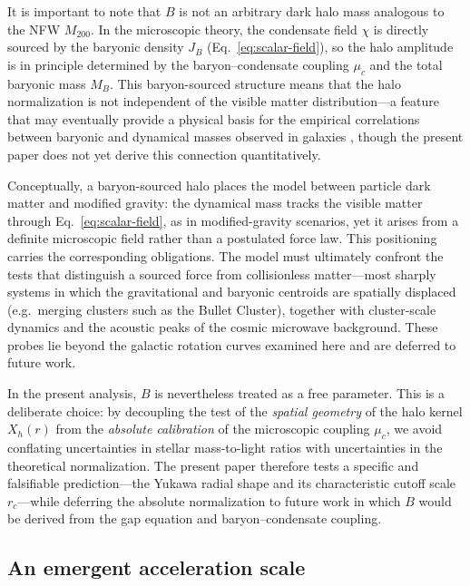 \documentclass[11pt,a4paper]{article}
\begin{document}
It is important to note that $B$ is not an arbitrary dark halo mass
analogous to the NFW $M_{200}$.
In the microscopic theory, the condensate field $\chi$ is directly
sourced by the baryonic density $J_B$
(Eq.~\ref{eq:scalar-field}), so the halo amplitude is in
principle determined by the baryon--condensate coupling $\mu_c$
and the total baryonic mass $M_B$.
This baryon-sourced structure means that the halo normalization
is not independent of the visible matter distribution---a feature
that may eventually provide a physical basis for the empirical
correlations between baryonic and dynamical masses observed in
galaxies \cite{McGaugh:2016leg,Lelli:2017vgz}, though the present
paper does not yet derive this connection quantitatively.

Conceptually, a baryon-sourced halo places the model between
particle dark matter and modified gravity: the dynamical mass
tracks the visible matter through Eq.~\eqref{eq:scalar-field}, as in
modified-gravity scenarios, yet it arises from a definite
microscopic field rather than a postulated force law.  This
positioning carries the corresponding obligations.  The model must
ultimately confront the tests that distinguish a sourced force from
collisionless matter---most sharply systems in which the
gravitational and baryonic centroids are spatially displaced (e.g.\
merging clusters such as the Bullet Cluster), together with
cluster-scale dynamics and the acoustic peaks of the cosmic
microwave background.  These probes lie beyond the galactic
rotation curves examined here and are deferred to future work.

In the present analysis, $B$ is nevertheless treated as a free
parameter.
This is a deliberate choice: by decoupling the test of the
\emph{spatial geometry} of the halo kernel $X_h(r)$ from the
\emph{absolute calibration} of the microscopic coupling $\mu_c$,
we avoid conflating uncertainties in stellar mass-to-light ratios
with uncertainties in the theoretical normalization.
The present paper therefore tests a specific and falsifiable
prediction---the Yukawa radial shape and its characteristic
cutoff scale $r_c$---while deferring the absolute normalization
to future work in which $B$ would be derived from the gap equation
and baryon--condensate coupling.

\subsection{An emergent acceleration scale}
\label{sec:a0}
\end{document}
